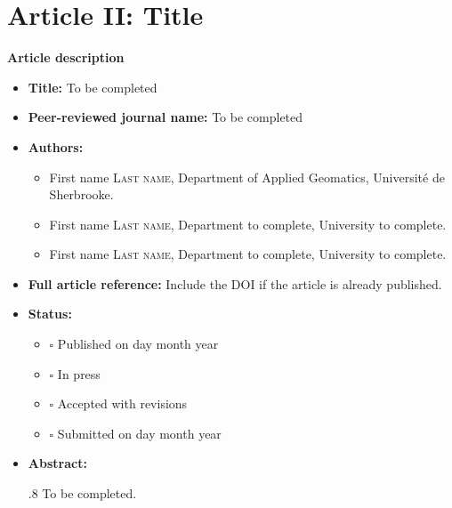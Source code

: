 \chapter{Article II: Title} \label{chap:article2}

{\large \textbf{Article description}}

\begin{itemize}
  \item \textbf{Title:} To be completed

  \item \textbf{Peer-reviewed journal name:} To be completed

  \item \textbf{Authors:}
    \begin{itemize}
    \item First name \textsc{Last name}, Department of Applied Geomatics, Université de Sherbrooke.
    \item First name \textsc{Last name}, Department to complete, University to complete.
    \item First name \textsc{Last name}, Department to complete, University to complete.
  \end{itemize}
  \item \textbf{Full article reference:} Include the DOI if the article is already published.

  \item \textbf{Status:}
        \begin{itemize}
            \item $\square$ Published on day month year
            \item $\square$ In press
            \item $\square$ Accepted with revisions
            \item $\square$ Submitted on day month year
   \end{itemize}

  \item \textbf{Abstract:} \begin{spacing}{.8}
  \small To be completed.
  \end{spacing}
\end{itemize}

